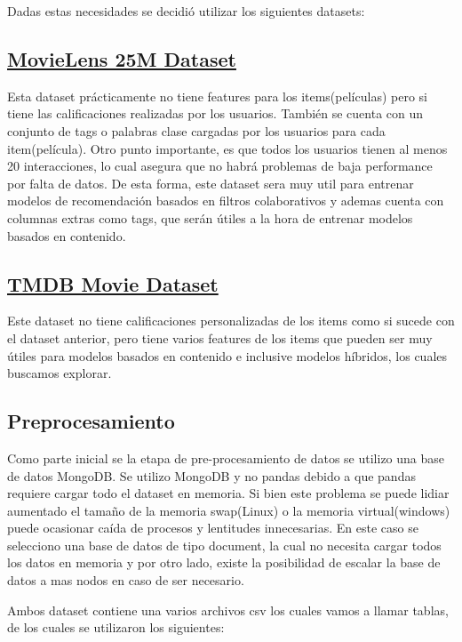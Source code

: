 \documentclass[11pt,a4paper,twoside]{thesis}
\begin{document}
Dadas estas necesidades se decidió utilizar los siguientes datasets:


\subsection{\href{https://grouplens.org/datasets/movielens/25m/}{MovieLens 25M Dataset}}

Esta dataset prácticamente no tiene features para los items(películas) pero si tiene las calificaciones realizadas 
por los usuarios. También se cuenta con un conjunto de tags o palabras clase cargadas por los usuarios para cada 
item(película). Otro punto importante, es que todos los usuarios tienen al menos 20 interacciones, lo cual asegura
que no habrá problemas de baja performance por falta de datos. 
De esta forma, este dataset sera muy util para entrenar modelos de recomendación basados en filtros colaborativos
y ademas cuenta con columnas extras como tags, que serán útiles a la hora de entrenar modelos basados en contenido.


\subsection{\href{https://www.kaggle.com/datasets/rounakbanik/the-movies-dataset?select=movies_metadata.csv}{TMDB Movie Dataset}}


Este dataset no tiene calificaciones personalizadas de los items como si sucede con el dataset anterior, 
pero tiene varios features de los items que pueden ser muy útiles para modelos basados en contenido e inclusive
modelos híbridos, los cuales buscamos explorar.


\subsection{Preprocesamiento}

Como parte inicial se la etapa de pre-procesamiento de datos se utilizo una base de datos MongoDB. Se utilizo MongoDB 
y no pandas debido a que pandas requiere cargar todo el dataset en memoria. Si bien este problema se puede lidiar 
aumentado el tamaño de la memoria swap(Linux) o la memoria virtual(windows) puede ocasionar caída de procesos y lentitudes 
innecesarias. En este caso se selecciono una base de datos de tipo document, la cual no necesita cargar todos los datos 
en memoria y por otro lado, existe la posibilidad de escalar la base de datos a mas nodos en caso de ser necesario.


Ambos dataset contiene una varios archivos csv los cuales vamos a llamar tablas, de los cuales se utilizaron los siguientes:
\end{document}
